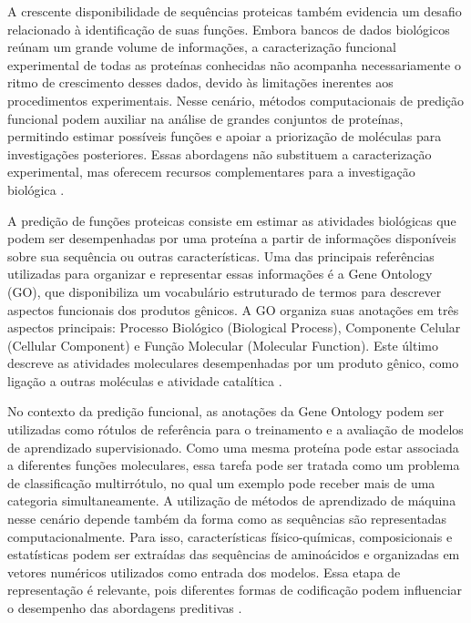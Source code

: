A crescente disponibilidade de sequências proteicas também evidencia um desafio relacionado à identificação de suas funções. Embora bancos de dados biológicos reúnam um grande volume de informações, a caracterização funcional experimental de todas as proteínas conhecidas não acompanha necessariamente o ritmo de crescimento desses dados, devido às limitações inerentes aos procedimentos experimentais. Nesse cenário, métodos computacionais de predição funcional podem auxiliar na análise de grandes conjuntos de proteínas, permitindo estimar possíveis funções e apoiar a priorização de moléculas para investigações posteriores. Essas abordagens não substituem a caracterização experimental, mas oferecem recursos complementares para a investigação biológica \cite{bonetta2020,lin2024}.

A predição de funções proteicas consiste em estimar as atividades biológicas que podem ser desempenhadas por uma proteína a partir de informações disponíveis sobre sua sequência ou outras características. Uma das principais referências utilizadas para organizar e representar essas informações é a Gene Ontology (GO), que disponibiliza um vocabulário estruturado de termos para descrever aspectos funcionais dos produtos gênicos. A GO organiza suas anotações em três aspectos principais: Processo Biológico (Biological Process), Componente Celular (Cellular Component) e Função Molecular (Molecular Function). Este último descreve as atividades moleculares desempenhadas por um produto gênico, como ligação a outras moléculas e atividade catalítica \cite{goconsortium2021}.

No contexto da predição funcional, as anotações da Gene Ontology podem ser utilizadas como rótulos de referência para o treinamento e a avaliação de modelos de aprendizado supervisionado. Como uma mesma proteína pode estar associada a diferentes funções moleculares, essa tarefa pode ser tratada como um problema de classificação multirrótulo, no qual um exemplo pode receber mais de uma categoria simultaneamente. A utilização de métodos de aprendizado de máquina nesse cenário depende também da forma como as sequências são representadas computacionalmente. Para isso, características físico-químicas, composicionais e estatísticas podem ser extraídas das sequências de aminoácidos e organizadas em vetores numéricos utilizados como entrada dos modelos. Essa etapa de representação é relevante, pois diferentes formas de codificação podem influenciar o desempenho das abordagens preditivas \cite{jing2020,bonetta2020}.

